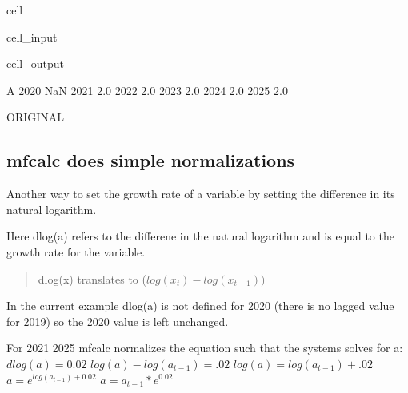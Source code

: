 \documentclass[letterpaper,10pt,english]{jupyterBook}
\begin{document}
\begin{sphinxuseclass}{cell}\begin{sphinxVerbatimInput}

\begin{sphinxuseclass}{cell_input}
\begin{sphinxVerbatim}[commandchars=\\\{\}]
 
\end{sphinxVerbatim}

\end{sphinxuseclass}\end{sphinxVerbatimInput}
\begin{sphinxVerbatimOutput}

\begin{sphinxuseclass}{cell_output}
\begin{sphinxVerbatim}[commandchars=\\\{\}]
        A
2020  NaN
2021  2.0
2022  2.0
2023  2.0
2024  2.0
2025  2.0
\end{sphinxVerbatim}

\end{sphinxuseclass}\end{sphinxVerbatimOutput}

\end{sphinxuseclass}
\sphinxAtStartPar
 ORIGINAL 


\subsection{mfcalc does simple normalizations}
\label{\detokenize{content/howto/update/extending_dataframes:mfcalc-does-simple-normalizations}}
\sphinxAtStartPar
Another way to set the growth rate of a variable by setting the difference in its natural logarithm.

\sphinxAtStartPar
Here  dlog(a) refers to the differene in the natural logarithm and is equal to the growth rate for the variable.
\begin{quote}

\sphinxAtStartPar
dlog(x) translates to  (\(log(x_t)-log(x_{t-1}))\)
\end{quote}

\sphinxAtStartPar
In the current example dlog(a) is not defined for 2020 (there is no lagged value for 2019) so the 2020 value is left unchanged.

\sphinxAtStartPar
For 2021 2025 mfcalc normalizes the equation such that the systems solves for a:
\(dlog(a)  = 0.02\) 
\(log(a)-log(a_{t-1}) = .02\)
\(log(a)=log(a_{t-1})+.02\) 
\(a = e^{log(a_{t-1})+0.02}\) 
\(a =a_{t-1}*e^{0.02}\)
\end{document}
